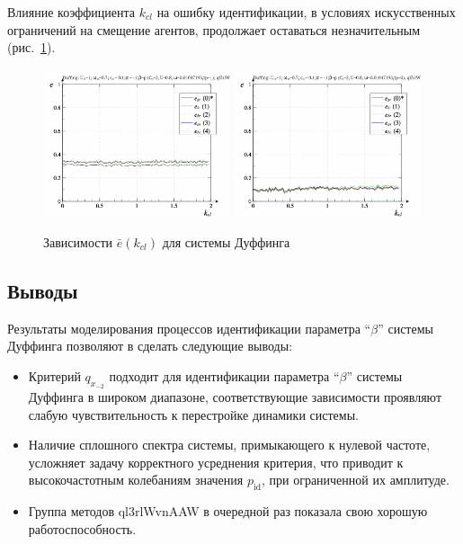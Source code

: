 Влияние коэффициента $k_{cl}$ на ошибку идентификации,
в условиях искусственных ограничений на смещение агентов,
продолжает оставаться незначительным
(рис.~\ref{atu:f:duff_e_k_cl}).

\begin{figure}[ht!]
\begin{center}
  \includegraphics[width=0.49\textwidth]{p/cha/duff/duff_id-p_k_cl_sign.png}
  \hfill
  \includegraphics[width=0.49\textwidth]{p/cha/duff/duff_id-p_k_cl_sin.png}
\end{center}
  \caption{Зависимости $\bar{e}(k_{cl})$ для системы Дуффинга}
\label{atu:f:duff_e_k_cl}
\end{figure}



\subsection{Выводы}  %

Результаты моделирования
процессов идентификации параметра ``$\beta$''
системы Дуффинга
позволяют в сделать следующие выводы:

\begin{itemize}

  \item
    Критерий $q_{x_{-2}}$ подходит для идентификации параметра ``$\beta$''
    системы Дуффинга в широком диапазоне, соответствующие зависимости
    проявляют слабую чувствительность к перестройке динамики системы.

  \item
    Наличие сплошного спектра системы, примыкающего к нулевой частоте,
    усложняет задачу корректного усреднения критерия,
    что приводит к высокочастотным колебаниям значения $p_\mathrm{id}$,
    при ограниченной их амплитуде.

  \item
    Группа методов ql3rlWvnAAW в очередной раз показала свою хорошую работоспособность.


\end{itemize}




